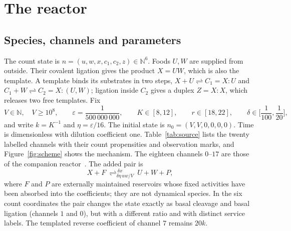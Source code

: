 \documentclass[11pt,a4paper]{article}
\theoremstyle{plain}
\theoremstyle{definition}
\theoremstyle{remark}
\newcommand{\N}{\mathbb N}
\newcommand{\eps}{\varepsilon}
\begin{document}
\section{The reactor}\label{sec:model}

\subsection{Species, channels and parameters}

The count state is $n=(u,w,x,c_1,c_2,z)\in\N^6$. Foods $U,W$ are supplied from outside. Their covalent ligation gives the product $X=UW$, which is also the template. A template binds its substrates in two steps, $X+U\rightleftharpoons C_1=X{:}U$ and $C_1+W\rightleftharpoons C_2=X{:}(U,W)$; ligation inside $C_2$ gives a duplex $Z=X{:}X$, which releases two free templates. Fix
\begin{equation}\label{eq:box}
 V\in\N,\quad V\ge10^8,\qquad
 \eps=\frac1{500\,000\,000},\qquad
 K\in[8,12],\qquad r\in[18,22],\qquad
 \delta\in\Big[\frac1{100},\frac1{20}\Big],
\end{equation}
and write $k=K^{-1}$ and $\eta=\eps/16$. The initial state is $n_0=(V,V,0,0,0,0)$. Time is dimensionless with dilution coefficient one. Table~\ref{tab:source} lists the twenty labelled channels with their count propensities and observation marks, and Figure~\ref{fig:scheme} shows the mechanism. The eighteen channels $0$--$17$ are those of the companion reactor~\citep{predecessor2026}. The added pair is
\begin{equation}\label{eq:drive}
 X+F\ \mathop{\rightleftharpoons}^{\ \delta x\ }_{\delta\eta\,uw/V}\ U+W+P,
\end{equation}
where $F$ and $P$ are externally maintained reservoirs whose fixed activities have been absorbed into the coefficients; they are not dynamical species. In the six count coordinates the pair changes the state exactly as basal cleavage and basal ligation (channels $1$ and $0$), but with a different ratio and with distinct service labels. The templated reverse coefficient of channel $7$ remains $20k$.
\end{document}
